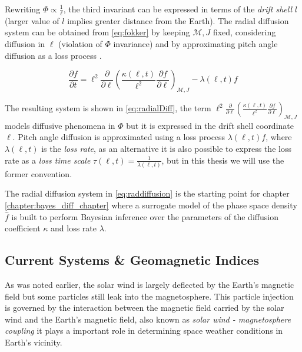 Rewriting $\Phi \propto \frac{1}{\ell}$, the third invariant can be expressed in terms of the 
\emph{drift shell} $l$ (larger value of $l$ implies greater distance from the Earth). The radial diffusion system 
can be obtained from \cref{eq:fokker} by keeping $\mathcal{M}, J$ fixed, considering diffusion in $\ell$ 
(violation of $\Phi$ invariance) and by approximating pitch angle diffusion as a loss process 
\citep{roederer2012dynamics,Walt1970}.  

\begin{equation}\label{eq:radialDiff}
    \frac{\partial{f}}{\partial{t}} = \ell^2 \frac{\partial}{\partial{\ell}} \left( \frac{\kappa(\ell,
        t)}{\ell^{2}} \frac{\partial{f}}{\partial{\ell}}
    \right)_{\mathcal{M}, J} - \lambda(\ell,t) f
\end{equation}

The resulting system is shown in \cref{eq:radialDiff}, the term 
$\ell^2 \frac{\partial}{\partial{\ell}} \left( \frac{\kappa(\ell,t)}{\ell^{2}} \frac{\partial{f}}{\partial{\ell}}
\right)_{\mathcal{M}, J}$ models diffusive phenomena in $\Phi$ but it is expressed in the drift shell coordinate $\ell$. 
Pitch angle diffusion is approximated using a loss process $\lambda(\ell,t) f$, where $\lambda(\ell,t)$ is the 
\emph{loss rate}, as an alternative it is also possible to express the loss rate as a \emph{loss time scale} 
$\tau(\ell,t) = \frac{1}{\lambda(\ell,t)}$, but in this thesis we will use the former convention.

The radial diffusion system in \cref{eq:raddiffusion} is the starting point for chapter 
\ref{chapter:bayes_diff_chapter} where a surrogate model of the phase space density $\hat{f}$ is built to 
perform Bayesian inference over the parameters of the diffusion coefficient $\kappa$ and loss rate 
$\lambda$.

\subsection{Current Systems \& Geomagnetic Indices}\label{sec:geoindex}

As was noted earlier, the solar wind is largely deflected by the Earth's magnetic field but some particles still 
leak into the magnetosphere. This particle injection is governed by the interaction between the magnetic field carried 
by the solar wind and the Earth's magnetic field, also known as \emph{solar wind - magnetosphere coupling} it 
plays a important role in determining space weather conditions in Earth's vicinity. 

